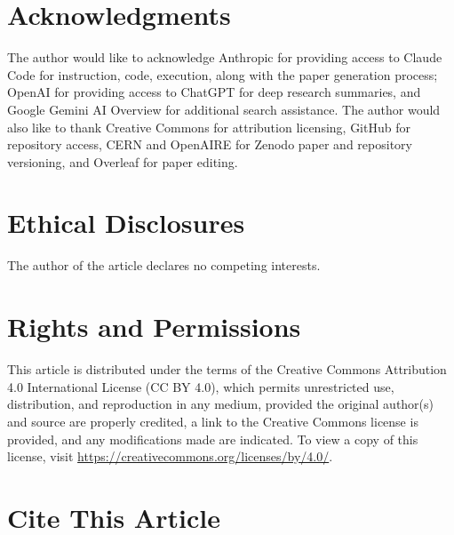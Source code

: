 
{}
\section*{Acknowledgments}
\label{sec:acknowledgments}

The author would like to acknowledge Anthropic for providing access to Claude
Code for instruction, code, execution, along with the paper generation process;
OpenAI for providing access to ChatGPT for deep research summaries, and Google
Gemini AI Overview for additional search assistance. The author would also like to thank Creative Commons for attribution licensing, GitHub for repository access, CERN and OpenAIRE for Zenodo paper and repository versioning, and Overleaf for paper editing.
 


{}
\section*{Ethical Disclosures}
\label{sec:ethics}

The author of the article declares no competing interests.

{}
\section*{Rights and Permissions}
\label{sec:rights}

This article is distributed under the terms of the Creative Commons Attribution
4.0 International License (CC BY 4.0), which permits unrestricted use,
distribution, and reproduction in any medium, provided the original author(s)
and source are properly credited, a link to the Creative Commons license is
provided, and any modifications made are indicated. To view a copy of this
license, visit \url{https://creativecommons.org/licenses/by/4.0/}.

{}
\section*{Cite This Article}
\label{sec:cite}

